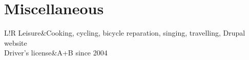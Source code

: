 \documentclass[11pt]{article}
\newcommand\VRule{\color{lightgray}\vrule width 0.5pt}
\begin{document}
\section*{Miscellaneous}
\begin{tabular}{L!{\VRule}R}
Leisure&Cooking, cycling, bicycle reparation, singing, 
travelling, Drupal website\\
Driver's license&A+B since 2004\\
\end{tabular}

    
\renewcommand{\refname}{Publications}
\begingroup
    \fontsize{9pt}{11pt}\selectfont


\endgroup
\fontsize{14pt}{0pt}
\end{document}
